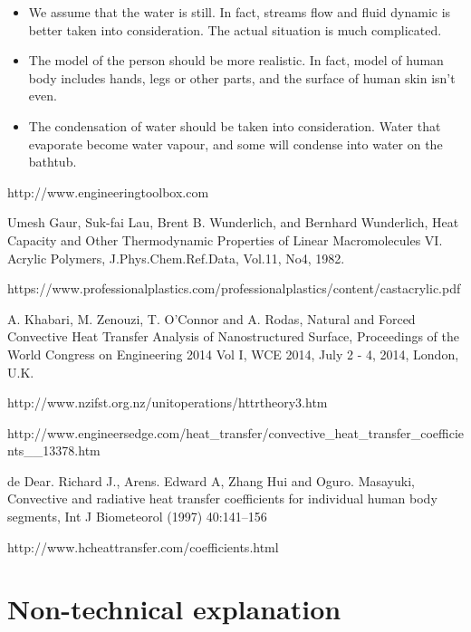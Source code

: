 \documentclass[12pt,a4paper,titlepage]{article}
\begin{document}
\begin{itemize}
\item We assume that the water is still. In fact, streams flow and fluid dynamic is better taken into consideration. The actual situation is much complicated.
\item The model of the person should be more realistic. In fact, model of human body includes hands, legs or other parts, and the surface of human skin isn't even.
\item The condensation of water should be taken into consideration. Water that evaporate become water vapour, and some will condense into water on the bathtub.
\end{itemize}


\begin{thebibliography}{99}


 http://www.engineeringtoolbox.com

 Umesh Gaur, Suk-fai Lau, Brent B. Wunderlich, and Bernhard Wunderlich, Heat Capacity and Other Thermodynamic Properties of Linear Macromolecules VI. Acrylic Polymers, J.Phys.Chem.Ref.Data, Vol.11, No4, 1982.

 https://www.professionalplastics.com/professionalplastics/content/castacrylic.pdf

 A. Khabari, M. Zenouzi, T. O’Connor and A. Rodas, Natural and Forced Convective Heat Transfer Analysis of Nanostructured Surface, Proceedings of the World Congress on Engineering 2014 Vol I, WCE 2014, July 2 - 4, 2014, London, U.K.

 http://www.nzifst.org.nz/unitoperations/httrtheory3.htm

 http://www.engineersedge.com/heat\_transfer/convective\_heat\_transfer\_coefficients\_\_13378.htm

 de Dear. Richard J., Arens. Edward A, Zhang Hui and Oguro. Masayuki, Convective and radiative heat transfer coefficients for individual human body segments, Int J Biometeorol (1997) 40:141–156

 http://www.hcheattransfer.com/coefficients.html

\end{thebibliography}

\label{LastPage}

\section{Non-technical explanation}
\end{document}
